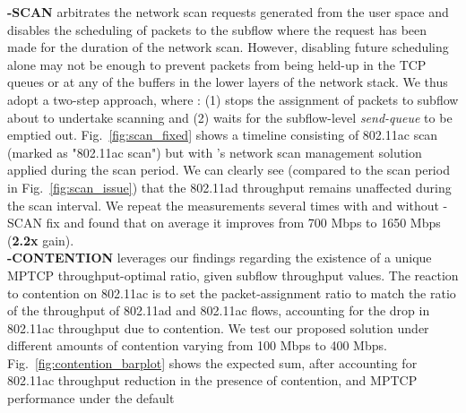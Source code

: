 \begin{figure*}[ht]
    \centering
    \hfill
    \hfill
    \vspace{-0.15in}
    \caption{\name}
    \vspace{-0.1in}
\end{figure*}
\fi

\noindent\textbf{\name-SCAN} arbitrates the network scan requests generated
from the user space and disables the scheduling of packets to the
subflow where the request has been made for the duration of the
network scan. However, disabling future scheduling alone may not be
enough to prevent packets from being held-up in the TCP queues or at
any of the buffers in the lower layers of the network stack. We thus
adopt a two-step approach, where \name: (1) stops the assignment of
packets to subflow about to undertake scanning and (2) waits for the
subflow-level \emph{send-queue} to be emptied out. Fig.~\ref{fig:scan_fixed} shows 
a timeline consisting of 802.11ac scan (marked as "802.11ac scan") but with \name's 
network scan management solution applied during the scan period. We can clearly see (compared
to the scan period in Fig.~\ref{fig:scan_issue}) that the 802.11ad
throughput remains unaffected during the scan interval. We repeat the
measurements several times with and without \name-SCAN fix and found 
that on average it improves from 700 Mbps to 1650 Mbps (\textbf{2.2x} gain).
\\
\noindent\textbf{\name-CONTENTION} leverages our findings regarding the 
existence of a unique MPTCP throughput-optimal ratio, given subflow throughput values. The 
reaction to contention on 802.11ac is to set the packet-assignment ratio to match the ratio of
the throughput of 802.11ad and 802.11ac flows, accounting for the drop
in 802.11ac throughput due to contention. We test our proposed
solution under different amounts of contention varying from 100 Mbps
to 400 Mbps. Fig.~\ref{fig:contention_barplot} shows the expected sum,
after accounting for 802.11ac throughput reduction in the presence of
contention, and MPTCP performance under the default

